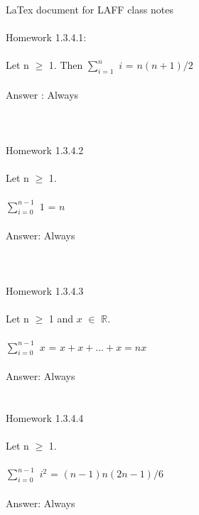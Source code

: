\documentclass[11pt]{article}
\begin{document}
LaTex document for LAFF class notes
\\
\\
Homework 1.3.4.1:
\\
\\
Let n $\geq$ 1. Then $\sum^n_{i=1}$ $i$ = $n(n + 1) / 2$
\\
\\
Answer : Always
\\
\\
\\
\\
Homework 1.3.4.2
\\
\\
Let n $\geq$ 1.
\\
\\
$\sum^{n-1}_{i=0}$ $1$ = $n$
\\
\\
Answer: Always
\\
\\
\\
\\
Homework 1.3.4.3
\\
\\
Let n $\geq$ 1 and $x$ $\in$ $\mathbb{R}$.
\\
\\
$\sum^{n-1}_{i=0}$ $x$ = $x + x + ... + x = nx$
\\
\\
Answer: Always 
\\
\\
\\
Homework 1.3.4.4
\\
\\
Let n $\geq$ 1.
\\
\\
$\sum^{n-1}_{i=0}$ $i^2$ = $(n - 1)n(2n - 1)/6$
\\
\\
Answer: Always

 
\end{document}

